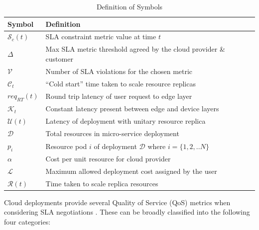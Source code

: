 \begin{table}
    \caption{Definition of Symbols}\label{tab:symbol-definitions}
    \centering
    \begin{tabular}{|l l|}
        \hline
        Symbol & Definition\\
        \hline
        $\mathcal{S}_{c}(t)$ & SLA constraint metric value at time $t$\\
        $\Delta$ & Max SLA metric threshold agreed by the cloud provider \& customer\\
        $\mathcal{V}$ & Number of SLA violations for the chosen metric\\
        $\mathcal{C}_{t}$ & ``Cold start'' time taken to scale resource replicas\\
        $req_{RT}(t)$ & Round trip latency of user request to edge layer\\
        $\mathcal{K}_{t}$ & Constant latency present between edge and device layers\\
        $\mathcal{U}(t)$ & Latency of deployment with unitary resource replica\\
        $\mathcal{D}$ & Total resources in micro-service deployment\\
        $p_{i}$ & Resource pod $i$ of deployment $\mathcal{D}$ where $i = \{1, 2, .. N\}$\\
        $\alpha$ & Cost per unit resource for cloud provider\\
        $\mathcal{L}$ & Maximum allowed deployment cost assigned by the user\\
        $\mathcal{R}(t)$ & Time taken to scale replica resources\\
        \hline
    \end{tabular}
\end{table}

Cloud deployments provide several Quality of Service (QoS) metrics when considering SLA negotiations \cite{serrano2016sla}. These can be broadly classified into the following four categories:

